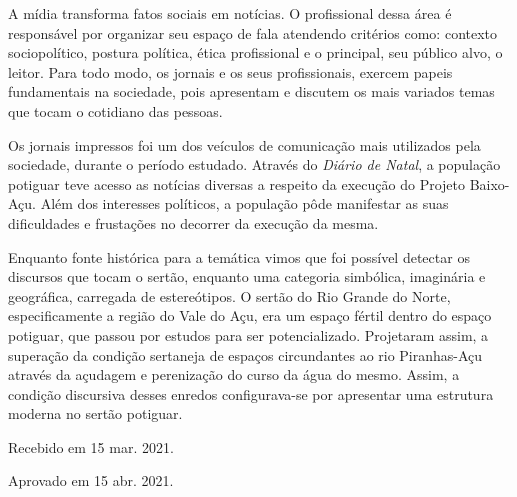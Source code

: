 \begin{refsection}
    A mídia transforma fatos sociais em notícias. O profissional dessa área é responsável por organizar seu espaço de fala atendendo critérios como: contexto sociopolítico, postura política, ética profissional e o principal, seu público alvo, o leitor. Para todo modo, os jornais e os seus profissionais, exercem papeis fundamentais na sociedade, pois apresentam e discutem os mais variados temas que tocam o cotidiano das pessoas.  

    Os jornais impressos foi um dos veículos de comunicação mais utilizados pela sociedade, durante o período estudado. Através do \textit{Diário de Natal}, a população potiguar teve acesso as notícias diversas a respeito da execução do Projeto Baixo-Açu. Além dos interesses políticos, a população pôde manifestar as suas dificuldades e frustações no decorrer da execução da mesma.   

    Enquanto fonte histórica para a temática vimos que foi possível detectar os discursos que tocam o sertão, enquanto uma categoria simbólica, imaginária e geográfica, carregada de estereótipos. O sertão do Rio Grande do Norte, especificamente a região do Vale do Açu, era um espaço fértil dentro do espaço potiguar, que passou por estudos para ser potencializado. Projetaram assim, a superação da condição sertaneja de espaços circundantes ao rio Piranhas-Açu através da açudagem e perenização do curso da água do mesmo.  Assim, a condição discursiva desses enredos configurava-se por apresentar uma estrutura moderna no sertão potiguar.

    \nocite{Pesavento2007Cidades}
    \nocite{Silva2009Influencia}
    \nocite{Souza2010Escafandristas}
    \nocite{Weber2012Metodologia}

    \printbibliography[heading=subbibliography,notcategory=fullcited]

    \hfill Recebido em 15 mar. 2021.

    \hfill Aprovado em 15 abr. 2021.

    \label{chap:diarionatalend}

\end{refsection}
